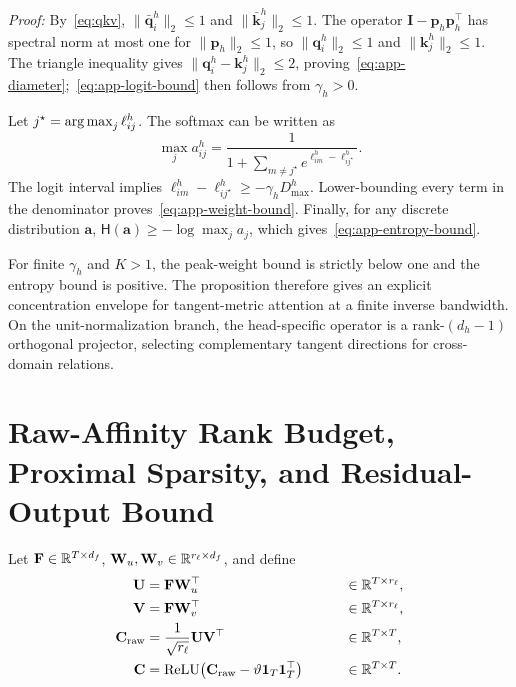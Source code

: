 \emph{Proof:} By~\eqref{eq:qkv},
\(\|\bar{\mathbf q}_i^h\|_2\leq1\) and
\(\|\bar{\mathbf k}_j^h\|_2\leq1\). The operator \(\mathbf I-\mathbf p_h\mathbf p_h^\top\) has spectral norm at most one for \(\|\mathbf p_h\|_2\leq1\), so
\(\|\mathbf q_i^h\|_2\leq1\) and
\(\|\mathbf k_j^h\|_2\leq1\). The triangle inequality gives
\(\|\mathbf q_i^h-\mathbf k_j^h\|_2\leq2\), proving~\eqref{eq:app-diameter};~\eqref{eq:app-logit-bound} then follows from \(\gamma_h>0\).

Let \(j^\star=\operatorname*{arg\,max}_j \ell_{ij}^{h}\). The softmax can be written as
\begin{equation}
\max_j a_{ij}^{h}
=\frac{1}{1+
\sum_{m\neq j^\star}
e^{\ell_{im}^{h}-\ell_{ij^\star}^{h}}}.
\label{eq:app-softmax}
\end{equation}
The logit interval implies
\(\ell_{im}^{h}-\ell_{ij^\star}^{h}\geq-\gamma_hD_{\max}^{h}\). Lower-bounding every term in the denominator proves~\eqref{eq:app-weight-bound}. Finally, for any discrete distribution \(\mathbf a\),
\(\mathsf H(\mathbf a)\geq-\log\max_j a_j\), which gives~\eqref{eq:app-entropy-bound}.

For finite \(\gamma_h\) and \(K>1\), the peak-weight bound is strictly below one and the entropy bound is positive. The proposition therefore gives an explicit concentration envelope for tangent-metric attention at a finite inverse bandwidth. On the unit-normalization branch, the head-specific operator is a rank-\((d_h-1)\) orthogonal projector, selecting complementary tangent directions for cross-domain relations.

\section{Raw-Affinity Rank Budget, Proximal Sparsity, and Residual-Output Bound}
\label{app:affinity}
Let \(\mathbf F\in\mathbb{R}^{T\times d_f}\),
\(\mathbf W_u,\mathbf W_v\in\mathbb{R}^{r_\ell\times d_f}\), and define
\begin{alignat}{2}
\mathbf U
&=\mathbf F\mathbf W_u^\top
&\qquad&\in\mathbb{R}^{T\times r_\ell},
\label{eq:app-u}\\
\mathbf V
&=\mathbf F\mathbf W_v^\top
&&\in\mathbb{R}^{T\times r_\ell},
\label{eq:app-v}\\
\mathbf C_{\mathrm{raw}}
&=\frac{1}{\sqrt{r_\ell}}\mathbf U\mathbf V^\top
&&\in\mathbb{R}^{T\times T},
\label{eq:app-craw}\\
\mathbf C
&=\operatorname{ReLU}\!\left(
\mathbf C_{\mathrm{raw}}-\vartheta\mathbf1_T\mathbf1_T^\top
\right)
&&\in\mathbb{R}^{T\times T}.
\label{eq:app-c}
\end{alignat}

